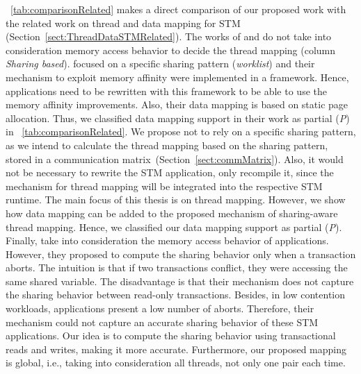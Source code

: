 \tablename~\ref{tab:comparisonRelated} makes a direct comparison of our proposed work with the related work on thread and data mapping for STM (Section~\ref{sect:ThreadDataSTMRelated}). The works of  and  do not take into consideration memory access behavior to decide the thread mapping (column \textit{Sharing based}).  focused on a specific sharing pattern (\textit{worklist}) and their mechanism to exploit memory affinity were implemented in a framework. Hence, applications need to be rewritten with this framework to be able to use the memory affinity improvements. Also, their data mapping is based on static page allocation. Thus, we classified data mapping support in their work as partial (\textit{P}) in \tablename~\ref{tab:comparisonRelated}. %
We propose not to rely on a specific sharing pattern, as we intend to calculate the thread mapping based on the sharing pattern, stored in a communication matrix~(Section~\ref{sect:commMatrix}). Also, it would not be necessary to rewrite the STM application, only recompile it, since the mechanism for thread mapping will be integrated into the respective STM runtime. The main focus of this thesis is on thread mapping. However, we show how data mapping can be added to the proposed mechanism of sharing-aware thread mapping. Hence, we classified our data mapping support as partial (\textit{P}).  Finally,  take into consideration the memory access behavior of applications. 
However, they proposed to compute the sharing behavior only when a transaction aborts. The intuition is that if two transactions conflict, they were accessing the same shared variable. The disadvantage is that their mechanism does not capture the sharing behavior between read-only transactions. Besides, in low contention workloads, applications present a low number of aborts. Therefore, their mechanism could not capture an accurate sharing behavior of these STM applications. Our idea is to compute the sharing behavior using transactional reads and writes, making it more accurate. Furthermore, our proposed mapping is global, i.e., taking into consideration all threads, not only one pair each time.

